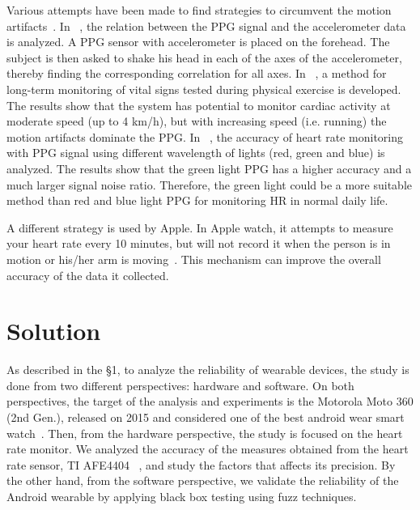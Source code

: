 \documentclass[11pt, draftclsnofoot, onecolumn]{IEEEtran}
\begin{document}
    Various attempts have been made to find strategies to circumvent the motion artifacts~\cite{couceiro2014detection}. In ~\cite{kim2007adaptive}, the relation between the PPG signal and the accelerometer data is analyzed. A PPG sensor with accelerometer is placed on the forehead. The subject is then asked to shake his head in each of the axes of the accelerometer, thereby finding the corresponding correlation for all axes. In ~\cite{santos2012accelerometer}, a method for long-term monitoring of vital signs tested during physical exercise is developed. The results show that the system has potential to monitor cardiac activity at moderate speed (up to 4 km/h), but with increasing speed (i.e. running) the motion artifacts dominate the PPG. In ~\cite{lee2013comparison}, the accuracy of heart rate monitoring with PPG signal using different wavelength of lights (red, green and blue) is analyzed. The results show that the green light PPG has a higher accuracy and a much larger signal noise ratio. Therefore, the green light could be a more suitable method than red and blue light PPG for monitoring HR in normal daily life.
    
    A different strategy is used by Apple. In Apple watch, it attempts to measure your heart rate every 10 minutes, but will not record it when the person is in motion or his/her arm is moving~\cite{AppleHeartRate2015}. This mechanism can improve the overall accuracy of the data it collected.

	\section{Solution} \label{sec:Solution}

As described in the \S 1, to analyze the reliability of wearable devices, the study is done from two different perspectives: hardware and software. On both perspectives, the target of the analysis and experiments is the Motorola Moto 360 (2nd Gen.), released on 2015 and considered one of the best android wear smart watch~\cite{BestAW2016}. Then, from the hardware perspective, the study is focused on the heart rate monitor. We analyzed the accuracy of the measures obtained from the heart rate sensor, TI AFE4404 ~\cite{AFE4404dev}, and study the factors that affects its precision. By the other hand, from the software perspective, we validate the reliability of the Android wearable by applying black box testing using fuzz techniques.
\end{document}
